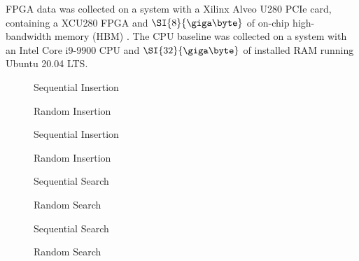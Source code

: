 
FPGA data was collected on a system with a Xilinx Alveo U280 PCIe card,
containing a XCU280 FPGA and $\SI{8}{\giga\byte}$ of on-chip high-bandwidth
memory (HBM) \autocite{u280}. The CPU baseline was collected on a system with an
Intel Core i9-9900 CPU and $\SI{32}{\giga\byte}$ of installed RAM running Ubuntu
20.04 LTS.




\begin{figure}[H]
	\centering
	
	\caption{Sequential Insertion}
	\label{fig:sequential-insertion}
\end{figure}

\begin{figure}[H]
	\centering
	
	\caption{Random Insertion}
	\label{fig:random-insertion}
\end{figure}



\begin{figure}[H]
	\centering
	
	\caption{Sequential Insertion}
	\label{fig:cpu-fanout-write}
\end{figure}

\begin{figure}[H]
	\centering
	
	\caption{Random Insertion}
	\label{fig:random-insertion}
\end{figure}



\begin{figure}[H]
	\centering
	
	\caption{Sequential Search}
	\label{fig:sequential-search}
\end{figure}

\begin{figure}[H]
	\centering
	
	\caption{Random Search}
	\label{fig:random-search}
\end{figure}



\begin{figure}[H]
	\centering
	
	\caption{Sequential Search}
	\label{fig:sequential-search}
\end{figure}

\begin{figure}[H]
	\centering
	
	\caption{Random Search}
	\label{fig:random-search}
\end{figure}


